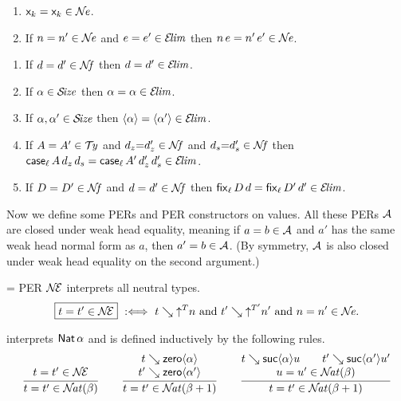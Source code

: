 \documentclass[acmsmall,screen]{acmart}\settopmatter{}
\makeatletter
\def\fleq{\@fleqntrue\let\mathindent\@mathmargin \@mathmargin=\leftmargini}
\makeatother
\begin{document}
\begin{lemma}
  \label{lem:closne}
  \bla
  \begin{enumerate}
  \item $\lev k = \lev k \in \NE$.
  \item If\/ $n = n' \in \NE$ and $e = e' \in \ELIM$ then $n\,e = n'\,e' \in \NE$.
  \end{enumerate}
\end{lemma}

\begin{lemma}
  \label{lem:closelim}
  \bla
  \begin{enumerate}
  \item If\/ $d = d' \in \NF$ then $d = d' \in \ELIM$.
  \item If\/ $\alpha \in \SIZE$ then $\alpha = \alpha \in \ELIM$.
  \item If\/ $\alpha,\alpha' \in \SIZE$ then $\ann \alpha = \ann{\alpha'} \in \ELIM$.
  \item If\/ $A = A' \in \TY$ and $d_z {=} d_z' \in \NF$ and $d_s {=} d_s' \in \NF$
        then $\case[\ell] A {d_z}{d_s} = \case[\ell]{A'}{d_z'}{d_s'} \in \ELIM$.
  \item If\/ $D = D' \in \NF$ and $d = d' \in \NF$ then $\fix[\ell] D d = \fix[\ell]{D'}{d'} \in \ELIM$.
  \end{enumerate}
\end{lemma}

Now we define some PERs and PER constructors on values.  All these PERs $\A$ are closed under weak head equality, meaning if $a = b \in \A$ and $a'$ has the same weak head normal form as $a$, then $a' = b \in \A$.  (By symmetry, $\A$ is also closed under weak head equality on the second argument.)

\fleq
PER $\NEE$ interprets all neutral types.
\[
\fbox{$t = t' \in \NEE$} \defas
  t \evalsto \up T n \mand t' \evalsto \up{T'}{n'} \mand
  n = n' \in \NE
  .
\]

\fbox{$\NAT(\alpha)$} interprets $\Nat \alpha$ and is defined inductively by the following rules.
\begin{gather*}
  \ru{%
      t = t' \in \NEE
    }{t = t' \in \NAT(\beta)}
\qquad
  \ru{t \evalsto \zero \alpha \\
      t' \evalsto \zero{\alpha'}
    }{t = t' \in \NAT(\beta+1)}
\qquad
  \ru{t \evalsto \suc \alpha u \qquad
      t' \evalsto \suc {\alpha'} {u'} \\
      u = u' \in \NAT(\beta)
    }{t = t' \in \NAT(\beta+1)}
\end{gather*}
\end{document}
